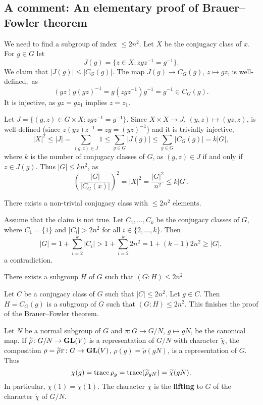 \subsection{A comment: An elementary proof of Brauer--Fowler theorem}

We need to find a subgroup of index $\leq 2n^2$. 
Let $X$ be the conjugacy class of $x$. For $g\in G$ let
\[
J(g)=\{z\in X:zgz^{-1}=g^{-1}\}.
\]
We claim that $|J(g)|\leq|C_G(g)|$. The map $J(g)\to C_G(g)$, $z\mapsto gz$, 
is well-defined,~as 
\[
(gz)g(gz)^{-1}=g(zgz^{-1})g^{-1}=g^{-1}\in C_G(g).
\]
It is injective, as $gz=gz_1$ implies $z=z_1$.

Let $J=\{(g,z)\in G\times X:zgz^{-1}=g^{-1}\}$.  
Since $X\times X\to J$, $(y,z)\mapsto (yz,z)$, 
is well-defined (since $z(yz)z^{-1}=zy=(yz)^{-1}$) and
it is trivially injective, 
\[
|X|^2\leq |J|=\sum_{(g,z)\in J}1\leq\sum_{g\in G}|J(g)|
\leq\sum_{g\in G}|C_G(g)|=k|G|,
\]
where $k$ is the number of conjugacy classes of $G$, 
as $(g,z)\in J$ if and only if $z\in J(g)$. Thus $|G|\leq kn^2$, as
\[
\left(\frac{|G|}{|C_G(x)|}\right)^2=|X|^2=\frac{|G|^2}{n^2}\leq k|G|.
\]

\begin{claim}
    There exists a non-trivial conjugacy class with $\leq 2n^2$ elements.
\end{claim}

Assume that the claim is not true. Let
$C_1,\dots,C_k$ be the conjugacy classes of $G$, where 
$C_1=\{1\}$ and $|C_i|>2n^2$ for all $i\in\{2,\dots,k\}$. Then
\[
|G|=1+\sum_{i=2}^k|C_i|>1+\sum_{i=2}^k2n^2=1+(k-1)2n^2\geq |G|,
\]
a contradiction. 

\begin{claim}
    There exists a subgroup $H$ of $G$ such that
    $(G:H)\leq 2n^2$.
\end{claim}

Let $C$ be a conjugacy class of $G$ such that 
$|C|\leq 2n^2$. Let $g\in C$.  
Then $H=C_G(g)$ is a subgroup of $G$ such that
$(G:H)\leq 2n^2$. 
This finishes the proof of the Brauer--Fowler theorem. 



Let $N$ be a normal subgroup of $G$ 
and $\pi\colon G\to G/N$, $g\mapsto gN$, be the canonical map. 
If $\widetilde{\rho}\colon G/N\to\mathbf{GL}(V)$ 
is a representation of $G/N$ with 
character
$\widetilde{\chi}$, the composition 
$\rho=\widetilde{\rho}\pi\colon G\to \mathbf{GL}(V)$, $\rho(g)=\widetilde{\rho}(gN)$, 
is a representation of $G$. 
Thus
\[
\chi(g)=\operatorname{trace}{\rho_g}=\operatorname{trace}(\widetilde{\rho}_{gN})=\widetilde{\chi}(gN).
\]
In particular, $\chi(1)=\widetilde{\chi}(1)$. The character $\chi$ 
is the \textbf{lifting} to $G$ of the character 
$\widetilde{\chi}$ of $G/N$. 

